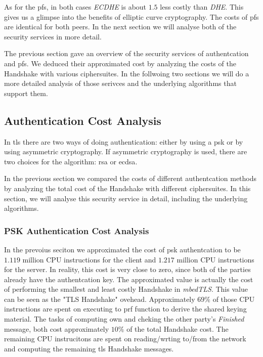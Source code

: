 \documentclass{llncs}
\begin{document}
As for the \gls{pfs}, in both cases \textit{ECDHE} is about $1.5$ less costly than \textit{DHE}. This gives us a glimpse
into the benefits of elliptic curve cryptography. The costs of \gls{pfs} are identical for both peers. In the next
section we will analyse both of the security services in more detail.

The previous section gave an overview of the security services of authentcation and \gls{pfs}. We deduced their
approximated cost by analyzing the costs of the Handshake with various ciphersuites. In the follwoing two sections
we will do a more detailed analysis of those serivces and the underlying algorithms that support them.

\subsection{Authentication Cost Analysis} \label{sec:auth-cost-analysis}

In \gls{tls} there are two ways of doing authentication: either by using a \gls{psk} or by using asymmetric cryptography.
If asymmetric cryptography is used, there are two choices for the algorithm: \gls{rsa} or \gls{ecdsa}.

In the previous section we compared the costs of different authentcation methods by analyzing the total cost of the
Handshake with different ciphersuites. In this section, we will analyse this security service in detail, including the
underlying algorithms.

\subsubsection{PSK Authentication Cost Analysis}

In the prevoius seciton we approximated the cost of \gls{psk} authentcation to be $1.119$ million CPU instructions 
for the client and $1.217$ million CPU instructions for the server. In reality, this cost is very close to zero, since
both of the parties already have the authentcation key. The approximated value is actually the cost of performing the 
smallest and least costly Handshake in \textit{mbedTLS}.
This value can be seen as the "TLS Handshake" ovehead. Approximately $69\%$ of those CPU instructions are spent on
executing to \gls{prf} function to derive the shared keying material. The tasks of computing own and cheking the other
party's \textit{Finished} message, both cost approximately $10\%$ of the total Handshake cost. The remaining CPU
instrucitons are spent on reading/wrting to/from the network and computing the remaining \gls{tls} Handshake messages.
\end{document}
